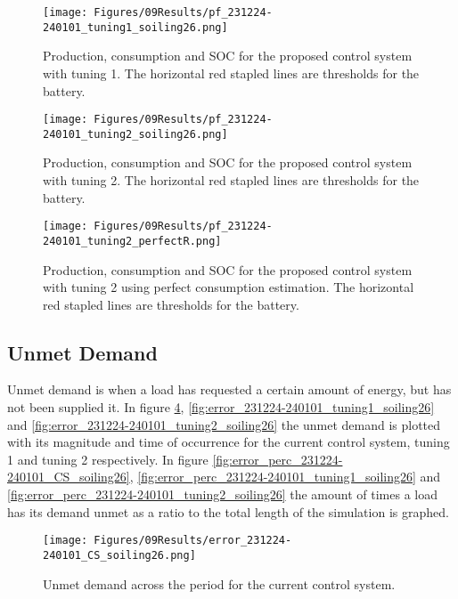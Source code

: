 \begin{figure}[h]
    \centering
    \texttt{[image: Figures/09Results/pf\_231224-240101\_tuning1\_soiling26.png]}
    \caption[Power flow proposed control system 1]{Production, consumption and SOC for the proposed control system with tuning 1. The horizontal red stapled lines are thresholds for the battery. }
    \label{fig:pf_231224-240101_tuning1_soiling26}
\end{figure}

\begin{figure}[h]
    \centering
    \texttt{[image: Figures/09Results/pf\_231224-240101\_tuning2\_soiling26.png]}
    \caption[Power flow proposed control system 2]{Production, consumption and SOC for the proposed control system with tuning 2. The horizontal red stapled lines are thresholds for the battery. }
    \label{fig:pf_231224-240101_tuning2_soiling26}
\end{figure}

\begin{figure}[h]
    \centering
    \texttt{[image: Figures/09Results/pf\_231224-240101\_tuning2\_perfectR.png]}
    \caption[Power flow proposed control system 2 perfect consumption estimation]{Production, consumption and SOC for the proposed control system with tuning 2 using perfect consumption estimation. The horizontal red stapled lines are thresholds for the battery. }
    \label{fig:pf_231224-240101_tuning2_perfectR}
\end{figure}

\subsection{Unmet Demand}

Unmet demand is when a load has requested a certain amount of energy, but has not been supplied it. In figure \ref{fig:error_231224-240101_CS_soiling26}, \ref{fig:error_231224-240101_tuning1_soiling26} and \ref{fig:error_231224-240101_tuning2_soiling26} the unmet demand is plotted with its magnitude and time of occurrence for the current control system, tuning 1 and tuning 2 respectively. In figure \ref{fig:error_perc_231224-240101_CS_soiling26}, \ref{fig:error_perc_231224-240101_tuning1_soiling26} and \ref{fig:error_perc_231224-240101_tuning2_soiling26} the amount of times a load has its demand unmet as a ratio to the total length of the simulation is graphed.

\begin{figure}[h]
    \centering
    \texttt{[image: Figures/09Results/error\_231224-240101\_CS\_soiling26.png]}
    \caption[Unmet demand current control system]{Unmet demand across the period for the current control system. }
    \label{fig:error_231224-240101_CS_soiling26}
\end{figure}

